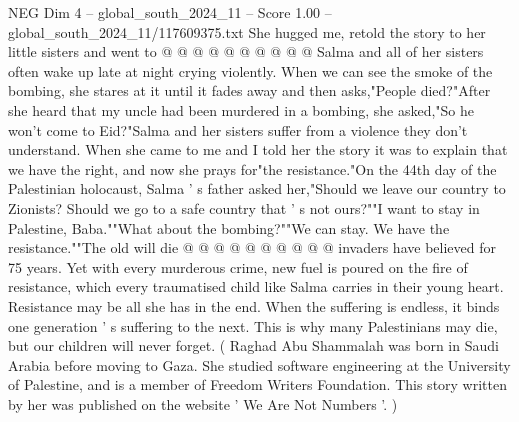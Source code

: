 \begin{textsample}{NEG Dim 4 – global\_south\_2024\_11 – Score 1.00 – global\_south\_2024\_11/117609375.txt}
She hugged me, retold the story to her little sisters and went to @ @ @ @ @ @ @ @ @ @ Salma and all of her sisters often wake up late at night crying violently.
When we can see the smoke of the bombing, she stares at it until it fades away and then asks,"People died?"After she heard that my uncle had been murdered in a bombing, she asked,"So he won't come to Eid?"Salma and her sisters suffer from a violence they don't understand.
When she came to me and I told her the story it was to explain that we have the right, and now she prays for"the resistance."On the 44th day of the Palestinian holocaust, Salma ' s father asked her,"Should we leave our country to Zionists?
Should we go to a safe country that ' s not ours?""I want to stay in Palestine, Baba.""What about the bombing?""We can stay.
We have the resistance.""The old will die @ @ @ @ @ @ @ @ @ @ invaders have believed for 75 years.
Yet with every murderous crime, new fuel is poured on the fire of resistance, which every traumatised child like Salma carries in their young heart.
Resistance may be all she has in the end.
When the suffering is endless, it binds one generation ' s suffering to the next.
This is why many Palestinians may die, but our children will never forget. ( Raghad Abu Shammalah was born in Saudi Arabia before moving to Gaza.
She studied software engineering at the University of Palestine, and is a member of Freedom Writers Foundation.
This story written by her was published on the website ' We Are Not Numbers '. )

\end{textsample}
